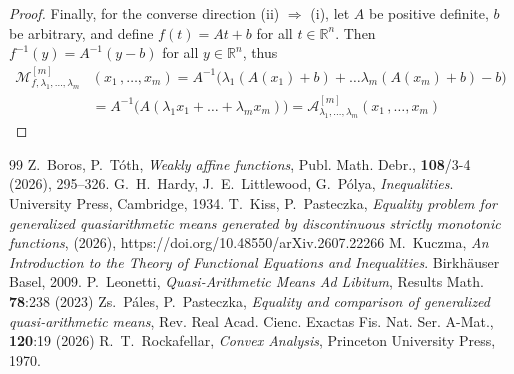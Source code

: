 \documentclass[10pt,a4paper]{amsart}
\newcommand{\Rn}{\mathbb{R}^n}
\begin{document}
\begin{proof}
Finally, for the converse direction 
(ii) $ \Longrightarrow $ (i), 
let $ A $ be positive definite, $ b $ be arbitrary, 
and define $ f(t) = At+b $ for all $ t \in \Rn $. Then 
$ f^{-1}(y) = A^{-1}(y-b) $ for all $ y \in \Rn $, thus 
\begin{align*}
\mathcal{M}_{f, \lambda_1 , \dots , \lambda_m}^{[m]} 
& \left( x_1 \,, \dots , x_m \right)
= A^{-1} \bigl( \lambda_1 \left( A(x_1) + b \right) + 
\dots \lambda_m \left( A(x_m) + b \right) - b \bigr) \\  
& = 
A^{-1} \bigl( A \left( 
\lambda_1 x_1 + \dots + \lambda_m x_m \right) \bigr) = 
\mathcal{A}_{\lambda_1 , \dots , \lambda_m}^{[m]} 
\left( x_1 \,, \dots , x_m \right) 
\end{align*}
\end{proof}


\begin{thebibliography}{99}
 Z.~Boros, P.~Tóth, {\em Weakly affine functions}, Publ. Math. Debr., {\bf 108}/3-4 (2026), 295--326.
 G.~H.~Hardy, J.~E.~Littlewood, G.~P\'olya, {\em Inequalities}. University Press, Cambridge, 1934.
 T.~Kiss, P.~Pasteczka, {\em Equality problem for generalized quasiarithmetic means generated by discontinuous strictly monotonic functions}, (2026), https://doi.org/10.48550/arXiv.2607.22266
 M.~Kuczma, {\em An Introduction to the Theory of Functional Equations and Inequalities}. Birkhäuser Basel, 2009.
 P.~Leonetti, {\em Quasi-Arithmetic Means Ad Libitum}, Results Math. {\bf 78}:238 (2023)
 Zs.~Páles, P.~Pasteczka, {\em Equality and comparison of generalized quasi-arithmetic means}, Rev. Real Acad. Cienc. Exactas Fis. Nat. Ser. A-Mat., {\bf 120}:19 (2026)
 R.~T.~Rockafellar, {\em Convex Analysis}, Princeton University Press, 1970.
\end{thebibliography}
\end{document}

